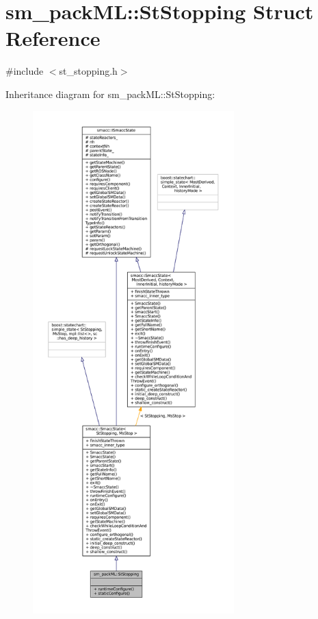 \hypertarget{structsm__packML_1_1StStopping}{}\section{sm\+\_\+pack\+ML\+:\+:St\+Stopping Struct Reference}
\label{structsm__packML_1_1StStopping}


{\ttfamily \#include $<$st\+\_\+stopping.\+h$>$}



Inheritance diagram for sm\+\_\+pack\+ML\+:\+:St\+Stopping\+:
\nopagebreak
\begin{figure}[H]
\begin{center}
\leavevmode
\includegraphics[height=550pt]{structsm__packML_1_1StStopping__inherit__graph}
\end{center}
\end{figure}


